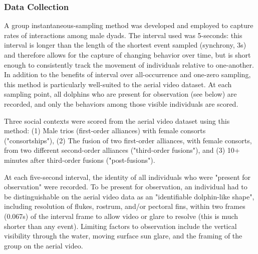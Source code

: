 \documentclass[11pt]{amsart}
\begin{document}
\subsubsection{Data Collection}
A group instantaneous-sampling method \citep{altmann:1974} was developed and employed to capture rates of interactions among male dyads. The interval used was 5-seconds: this interval is longer than the length of the shortest event sampled (synchrony, 3s) and therefore allows for the capture of changing behavior over time, but is short enough to consistently track the movement of individuals relative to one-another. %
In addition to the benefits of interval over all-occurrence and one-zero sampling, this method is particularly well-suited to the aerial video dataset. At each sampling point, all dolphins who are present for observation (see below) are recorded, and only the behaviors among those visible individuals are scored. %

Three social contexts were scored from the aerial video dataset using this method: (1) Male trios (first-order alliances) with female consorts ("consortships"), (2) The fusion of two first-order alliances, with female consorts, from two different second-order alliances ("third-order fusions"), and (3) 10+ minutes after third-order fusions ("post-fusions").

At each five-second interval, the identity of all individuals who were "present for observation" were recorded. To be present for observation, an individual had to be distinguishable on the aerial video data as an "identifiable dolphin-like shape", including resolution of flukes, rostrum, and/or pectoral fins, within two frames (0.067s) of the interval frame to allow video or glare to resolve (this is much shorter than any event). Limiting factors to observation include the vertical visibility through the water, moving surface sun glare, and the framing of the group on the aerial video. 
\end{document}
